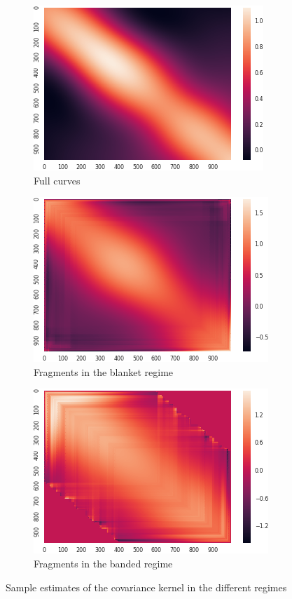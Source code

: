 \documentclass[10pt, a4paper]{report}
\theoremstyle{definition}
\theoremstyle{remark}
\begin{document}
\begin{figure}[H]
	\centering
	\begin{subfigure}{.3\textwidth}
		\centering
		\includegraphics[width=.8\linewidth]{Code/images/22/truecov}
		\caption{Full curves}
	\end{subfigure}%
	\begin{subfigure}{.3\textwidth}
		\centering
		\includegraphics[width=.8\linewidth]{Code/images/22/blanketheat}
		\caption{\centering Fragments in the blanket regime}
	\end{subfigure}
	\begin{subfigure}{.3\textwidth}
		\centering
		\includegraphics[width=.8\linewidth]{Code/images/22/fragsheat}
		\caption{\centering Fragments in the banded regime}
	\end{subfigure}
	\caption{Sample estimates of the covariance kernel in the different regimes}
	\label{fig:excov}
\end{figure}
\end{document}
